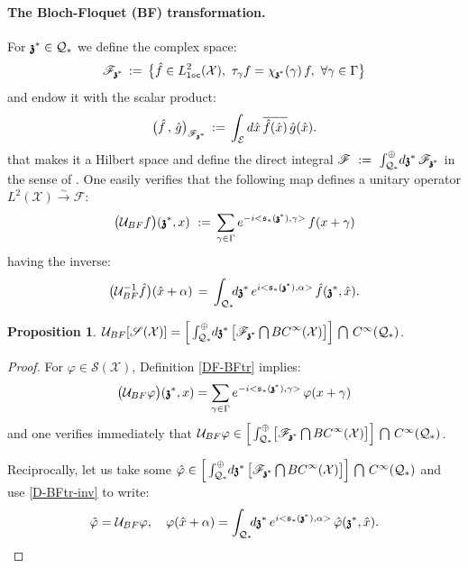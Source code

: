 \documentclass[12pt]{article}
\newtheorem{proposition}[theorem]{Proposition}
\theoremstyle{definition}
\def\X{\mathcal X}
\def\U{\mathcal{U}}
\def\E{\mathcal E}
\def\T{\mathcal{Q}}
\def\s{\mathfrak{s}}
\def\bz{\mathfrak{z}\hspace*{-4pt}\mathfrak{z}}
\def\beq{\begin{equation}}
\def\eeq{\end{equation}}
\numberwithin{equation}{section}
\begin{document}
\paragraph{The Bloch-Floquet (BF) transformation.} For $\bz^*\in\T_*$ we define the complex space:
\beq\label{DF-Fzst}
\mathscr{F}_{\bz^*}\,:=\,\big\{\hat{f}\in{L}^2_{\text{\tt loc}}(\X),\ \tau_{\gamma}f=\chi_{\bz^*}(\gamma)\,f,\ \forall\gamma\in\Gamma\big\}
\eeq
and endow it with the scalar product:
\beq\label{DF-psc-F}
\big(\hat{f}\,,\,\hat{g}\big)_{\mathscr{F}_{\bz^*}}\,:=\,\int_{\E}d\hat{x}\,\overline{\hat{f}(\hat{x})}\,\hat{g}(\hat{x}).
\eeq
that makes it a Hilbert space and define the direct integral $\mathscr{F}\ :=\ \int_{{\T}_*}^{\oplus}\hspace*{-2pt}d\bz^*\,\mathscr{F}_{\bz^*}$ in the sense of \cite{Dix}.
One easily verifies that the following map defines a unitary operator $L^2(\X)\overset{\sim}{\rightarrow}\mathscr{F}$:
\beq\label{DF-BFtr}
\big(\U_{BF}f\big)(\bz^*,x)\ :=\,\underset{\gamma\in\Gamma}{\sum}\,e^{-i<\s_*(\bz^*),\gamma>}\,f(x+\gamma)
\eeq
having the inverse:
\beq\label{D-BFtr-inv}
\big(\U_{BF}^{-1}\hat{f}\big)(\hat{x}+\alpha)\,=\,\int_{\T_*}\hspace*{-4pt}d\bz^*\,e^{i<\s_*(\bz^*),\alpha>}\,\hat{f}(\bz^*,\hat{x}).
\eeq
\begin{proposition}\label{P-UBF-S}
	$\U_{BF}[\mathscr{S}(\X)]=\Big[\int_{{\T}_*}^{\oplus}\hspace*{-2pt}d\bz^*\,\big[\mathscr{F}_{\bz^*}\bigcap{BC}^\infty(\X)\big]\Big]\,\bigcap\,C^\infty(\T_*)$.
\end{proposition}
\begin{proof}
	For $\varphi\in\mathscr{S}(\X)$, Definition \eqref{DF-BFtr} implies:
	\beq
	\big(\U_{BF}\varphi\big)(\bz^*,x)=\underset{\gamma\in\Gamma}{\sum}\,e^{-i<\s_*(\bz^*),\gamma>}\,\varphi(x+\gamma)
	\eeq
	and one verifies immediately that $\U_{BF}\varphi\in\Big[\int_{{\T}_*}^{\oplus}\hspace*{-2pt}\big[\mathscr{F}_{\bz^*}\bigcap{BC}^\infty(\X)\big]\Big]\,\bigcap\,C^\infty(\T_*)$.
	
	Reciprocally, let us take some $\hat{\varphi}\in\Big[\int_{{\T}_*}^{\oplus}\hspace*{-2pt}d\bz^*\,\big[\mathscr{F}_{\bz^*}\bigcap{BC}^\infty(\X)\big]\Big]\,\bigcap\,C^\infty(\T_*)$ and use \eqref{D-BFtr-inv} to write:
	\beq
	\hat{\varphi}=\U_{BF}\varphi,\quad\varphi(\hat{x}+\alpha)=\int_{\T_*}\hspace*{-4pt}d\bz^*\,e^{i<\s_*(\bz^*),\alpha>}\,\hat{\varphi}(\bz^*,\hat{x}).
	\eeq
\end{proof}
\end{document}
